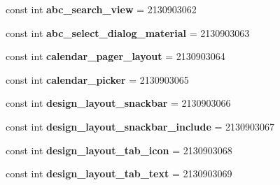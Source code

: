 \begin{DoxyCompactItemize}
\item 
\hypertarget{classClient_1_1Droid_1_1Resource_1_1Layout_a231fd5be941152285182aaa1b56ef9ac}{}const int {\bfseries abc\+\_\+search\+\_\+view} = 2130903062\label{classClient_1_1Droid_1_1Resource_1_1Layout_a231fd5be941152285182aaa1b56ef9ac}

\item 
\hypertarget{classClient_1_1Droid_1_1Resource_1_1Layout_aefb7538cb3952435bb7296cee02d48ce}{}const int {\bfseries abc\+\_\+select\+\_\+dialog\+\_\+material} = 2130903063\label{classClient_1_1Droid_1_1Resource_1_1Layout_aefb7538cb3952435bb7296cee02d48ce}

\item 
\hypertarget{classClient_1_1Droid_1_1Resource_1_1Layout_aca4a6647b33b86de1b6168293129d5cc}{}const int {\bfseries calendar\+\_\+pager\+\_\+layout} = 2130903064\label{classClient_1_1Droid_1_1Resource_1_1Layout_aca4a6647b33b86de1b6168293129d5cc}

\item 
\hypertarget{classClient_1_1Droid_1_1Resource_1_1Layout_a63fbffe18046fd0f2fc26ec6bd8668bf}{}const int {\bfseries calendar\+\_\+picker} = 2130903065\label{classClient_1_1Droid_1_1Resource_1_1Layout_a63fbffe18046fd0f2fc26ec6bd8668bf}

\item 
\hypertarget{classClient_1_1Droid_1_1Resource_1_1Layout_a7c724d348b6f377348a0dea33e5b4459}{}const int {\bfseries design\+\_\+layout\+\_\+snackbar} = 2130903066\label{classClient_1_1Droid_1_1Resource_1_1Layout_a7c724d348b6f377348a0dea33e5b4459}

\item 
\hypertarget{classClient_1_1Droid_1_1Resource_1_1Layout_a780ca4afe577697ea119096ac24145df}{}const int {\bfseries design\+\_\+layout\+\_\+snackbar\+\_\+include} = 2130903067\label{classClient_1_1Droid_1_1Resource_1_1Layout_a780ca4afe577697ea119096ac24145df}

\item 
\hypertarget{classClient_1_1Droid_1_1Resource_1_1Layout_a89f6d26d60246f0b2e17e699650de0a3}{}const int {\bfseries design\+\_\+layout\+\_\+tab\+\_\+icon} = 2130903068\label{classClient_1_1Droid_1_1Resource_1_1Layout_a89f6d26d60246f0b2e17e699650de0a3}

\item 
\hypertarget{classClient_1_1Droid_1_1Resource_1_1Layout_a7a53a44416288b6cb46f60c22673925f}{}const int {\bfseries design\+\_\+layout\+\_\+tab\+\_\+text} = 2130903069\label{classClient_1_1Droid_1_1Resource_1_1Layout_a7a53a44416288b6cb46f60c22673925f}


\end{DoxyCompactItemize}
